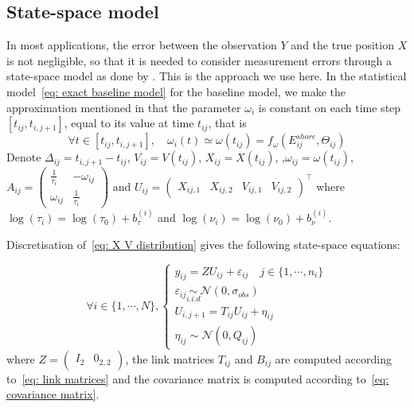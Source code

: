 \documentclass[11pt]{article}
\newcommand {\1}{\mathbb{1}}
\theoremstyle{definition}
\theoremstyle{remark}
\theoremstyle{remark}
\begin{document}
\subsection{State-space model}
\label{section: state space model}
In most applications, the error between the observation $Y$ and the true position $X$ is not negligible, so that it is needed to consider measurement errors through a state-space model as done by \cite{johnson_continuoustime_2008}. This is the approach we use here. In the statistical model~\ref{eq: exact baseline model} for the baseline model, we make the approximation mentioned in \cite{michelot_varying-coefficient_2021} that the parameter $\omega_i$ is constant on each time step $[t_{ij},t_{i,j+1}]$, equal to its value at time $t_{ij}$, that is 
\[\forall t \in [t_{ij},t_{i,j+1}], \quad \omega_{i}(t) \simeq \omega(t_{ij})= f_{\omega}(E^{shore}_{ij},\Theta_{ij})\]
 Denote $\Delta_{ij}=t_{i,j+1}-t_{ij}$, $V_{ij}=V(t_{ij})$, $X_{ij}=X(t_{ij})$, ,$\omega_{ij}=\omega(t_{ij})$, $A_{ij}=\begin{pmatrix} 
	\frac{1}{\tau_{i}} & -\omega_{ij} \\
	\omega_{ij} & \frac{1}{\tau_{i}}
\end{pmatrix}$ and $U_{ij}=\begin{pmatrix} X_{ij,1}  & X_{ij,2} & V_{ij,1} & V_{ij,2}\end{pmatrix}^\top$ where $\log(\tau_i)=\log(\tau_0)+b_{\tau}^{(i)}$ and $\log(\nu_i)=\log(\nu_0)+b_{\nu}^{(i)}$.

Discretisation of~\ref{eq: X V distribution} gives the following state-space equations:

\begin{equation}
	\forall i \in \{1,\cdots,N\}, \left\{
	\begin{array}{l}
		y_{ij}=ZU_{ij}+\varepsilon_{ij} \quad j \in \{1,\cdots,n_i\}\\
		\varepsilon_{ij} \underset{i.i.d}{\sim} \mathcal{N}(0,\sigma_{obs}) \\
		U_{i,j+1}=T_{ij} U_{ij} + \eta_{ij} \\
		\eta_{ij} \sim \mathcal{N}(0,Q_{ij})
	\end{array}
	\right.
	\label{eq: RACVM state space}
\end{equation}
where $Z=\begin{pmatrix} I_2 & 0_{2,2}\end{pmatrix}$, the link matrices $T_{ij}$ and $B_{ij}$ are computed according to~\ref{eq: link matrices} and the covariance matrix is computed according to~\ref{eq: covariance matrix}.
\\
\end{document}
